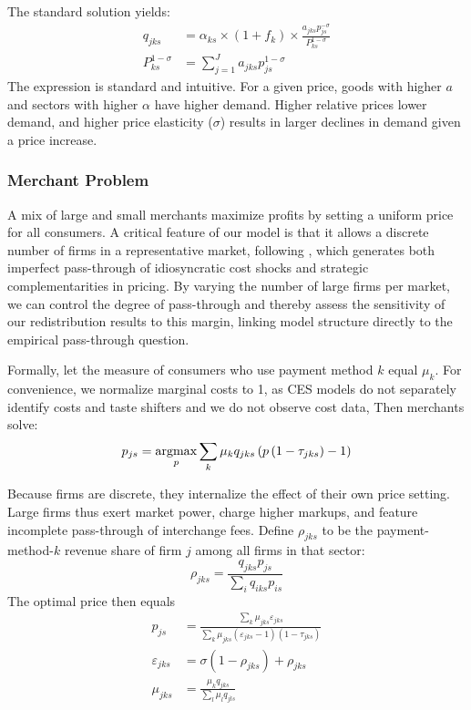 \documentclass[main.tex]{subfiles}
\begin{document}
The standard solution yields:
\begin{align}
q_{jks} & =\alpha_{ks}\times\left(1+f_{k}\right)\times\frac{a_{jks}p_{js}^{-\sigma}}{P_{ks}^{1-\sigma}} \\ \label{eq:consumer-demand}
P_{ks}^{1-\sigma} & =\sum_{j=1}^{J}a_{jks}p_{js}^{1-\sigma}
\end{align}
The expression is standard and intuitive.
For a given price, goods with higher $a$ and sectors with higher $\alpha$ have higher demand.
Higher relative prices lower demand, and higher price elasticity ($\sigma$) results in larger declines in demand given a price increase.

\subsubsection{Merchant Problem}

A mix of large and small merchants maximize profits by setting a uniform price for all consumers.
A critical feature of our model is that it allows a discrete number of firms in a representative market, following \citet{Hottman.etal2016}, which generates both imperfect pass-through of idiosyncratic cost shocks and strategic complementarities in pricing.
By varying the number of large firms per market, we can control the degree of pass-through and thereby assess the sensitivity of our redistribution results to this margin, linking model structure directly to the empirical pass-through question.

Formally, let the measure of consumers who use payment method $k$ equal $\mu_k$.
For convenience, we normalize marginal costs to 1, as CES models do not separately identify costs and taste shifters and we do not observe cost data,
Then merchants solve:
\[
p_{js}=\argmax_{p}\sum_{k}\mu_k q_{jks}\left(p\left(1-\tau_{jks}\right)-1\right)
\]

Because firms are discrete, they internalize the effect of their own price setting.
Large firms thus exert market power, charge higher markups, and feature incomplete pass-through of interchange fees.
Define $\rho_{jks}$ to be the payment-method-$k$ revenue share of firm $j$ among all firms in that sector:
\[
\rho_{jks} =\frac{q_{jks}p_{js}}{\sum_{i}q_{iks}p_{is}}
\]
The optimal price then equals
\begin{align}
  \label{eq:optimal-price-structural}
p_{js} & = \frac{\sum_{k}\mu_{jks}\varepsilon_{jks}}{\sum_{k}\mu_{jks}\left(\varepsilon_{jks}-1\right)\left(1-\tau_{jks}\right)} \\
  \varepsilon_{jks} & = \sigma(1-\rho_{jks}) + \rho_{jks} \\
\mu_{jks} & =\frac{\mu_k q_{jks}}{\sum_{l}\mu_l q_{jls}}
\end{align}
\end{document}

